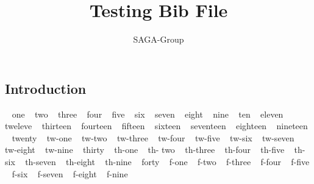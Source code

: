\documentclass[a4paper,10pt]{article}
\newcommand{\jhanote}[1]{  {\textcolor{red}     { ***Shantenu: #1 }}}
\newcommand{\jhanote}[1]{}
\begin{document}
 \title{ \Large \vspace{-3.5em} Testing Bib File }
 
 \author{ SAGA-Group
 }
 \date{}
 \maketitle
 




\subsection*{Introduction}

~\cite{sirvent2005grid} one
~\cite {sagastuff} two
~\cite {saga-req} three
~\cite {Kaiser:2006qp} four
~\cite {saga-uc} five
  ~\cite {1267323} six
  ~\cite {ogf-gfd-71} seven
  ~\cite {kaiser2006saga} eight
  ~\cite{hirmer2006seamless} nine
    ~\cite {escience07} ten
    ~\cite {ogf-gfd-90} eleven
    ~\cite {saga_gin} tweleve
     ~\cite {saga_condor} thirteen
      ~\cite {Luckow:2008la} fourteen
       ~\cite {saga_gfd90} fifteen
       ~\cite{saga_url} sixteen
       ~\cite {ogf-gwd-r-96} seventeen
       ~\cite {saga_tg08} eighteen
       ~\cite{jha2009developing} nineteen 
       ~\cite {10.1109/GPC.2009.17} twenty
	~\cite {saga_data_intensive_abstractions} tw-one
	~\cite {sagamontage09} tw-two
	~\cite {dpagrid2009} tw-three
	~\cite {1542058} tw-four
	~\cite {co2_escience2009} tw-five
	~\cite {repex_ptrsa} tw-six
	~\cite{gmac09} tw-seven
	~\cite{luckow2009adaptive} tw-eight
	~\cite{jha2009using} tw-nine
	~\cite{katz2009louisiana} thirty
	~\cite{2010RSPTA.368.4089M} th-one
	~\cite {saga_bigjob_condor_cloud} th- two
	~\cite{10.1109/CloudCom.2010.85} th-three
	~\cite{DBLP:conf/hpdc/KimHMAJ10} th-four
	~\cite{Sehgal2011590} th-five
	~\cite{ko-efficient} th-six
	~\cite{merzky-fresh} th-seven
	~\cite {jha-developing} th-eight
	~\cite {saga_mapreduce} th-nine
	~\cite {saga_condor_url} forty
	~\cite {remd-manager_url} f-one
	~\cite {gridrpc_url} f-two
	~\cite {jsaga} f-three
	~\cite {glite} f-four
	~\cite {ogf_web} f-five
	~\cite {saga_core_long} f-six
	~\cite {saga-tools} f-seven
	~\cite {saga-home} f-eight
	~\cite {async_repex11} f-nine
	

 
  
 
% 
\end{document}
